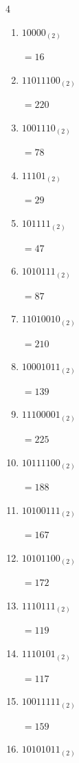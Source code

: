 \begin{multicols}{4}
\begin{enumerate}
        $=232$

  \item $10000_{(2)}$

        $=16$

  \item $11011100_{(2)}$

        $=220$

  \item $1001110_{(2)}$

        $=78$

  \item $11101_{(2)}$

        $=29$

  \item $101111_{(2)}$

        $=47$

  \item $1010111_{(2)}$

        $=87$

  \item $11010010_{(2)}$

        $=210$

  \item $10001011_{(2)}$

        $=139$

  \item $11100001_{(2)}$

        $=225$

  \item $10111100_{(2)}$

        $=188$

  \item $10100111_{(2)}$

        $=167$

\columnbreak %

  \item $10101100_{(2)}$

        $=172$

  \item $1110111_{(2)}$

        $=119$

  \item $1110101_{(2)}$

        $=117$

  \item $10011111_{(2)}$

        $=159$

  \item $10101011_{(2)}$


\end{enumerate}
\end{multicols}
